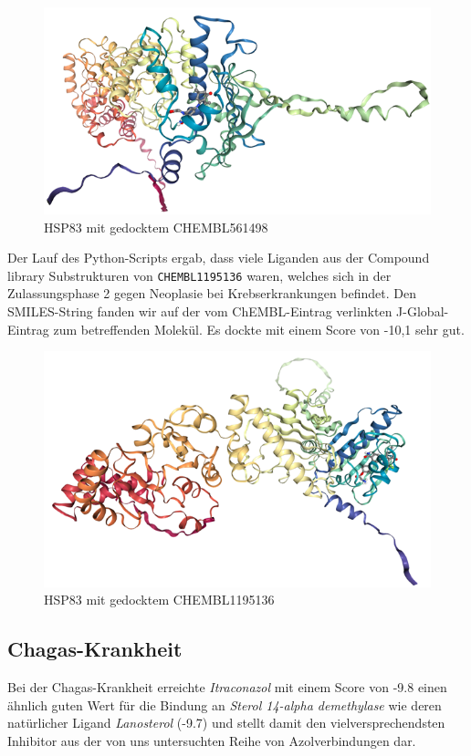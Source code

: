 \documentclass[10pt]{article}
\begin{document}
    \begin{figure}
        \centering
        \includegraphics[width=0.6\linewidth]{HSP83 mit gedocktem CHEMBL561498}
        \caption{HSP83 mit gedocktem CHEMBL561498}\label{fig:figure-hsp-CHEMBL561498}
    \end{figure}

    Der Lauf des Python-Scripts ergab, dass viele Liganden aus der Compound library Substrukturen von
    \texttt{CHEMBL1195136}
    waren, welches sich in der Zulassungsphase 2 gegen Neoplasie bei Krebserkrankungen befindet. Den SMILES-String
    fanden wir auf der vom ChEMBL-Eintrag verlinkten J-Global-Eintrag zum betreffenden Molekül.\cite{12} Es dockte
    mit einem
    Score von -10,1 sehr gut.

    \begin{figure}
        \centering
        \includegraphics[width=0.6\linewidth]{HSP83 mit gedocktem CHEMBL1195136}
        \caption{HSP83 mit gedocktem CHEMBL1195136}\label{fig:figure-hsp-CHEMBL1195136}
    \end{figure}

    \subsection{Chagas-Krankheit}
    Bei der Chagas-Krankheit erreichte \emph{Itraconazol} mit einem Score von -9.8 einen ähnlich guten Wert für die
    Bindung
    an \emph{Sterol 14-alpha demethylase} wie deren natürlicher Ligand \emph{Lanosterol} (-9.7) und stellt damit den
    vielversprechendsten Inhibitor aus der von uns untersuchten Reihe von Azolverbindungen dar.
\end{document}
